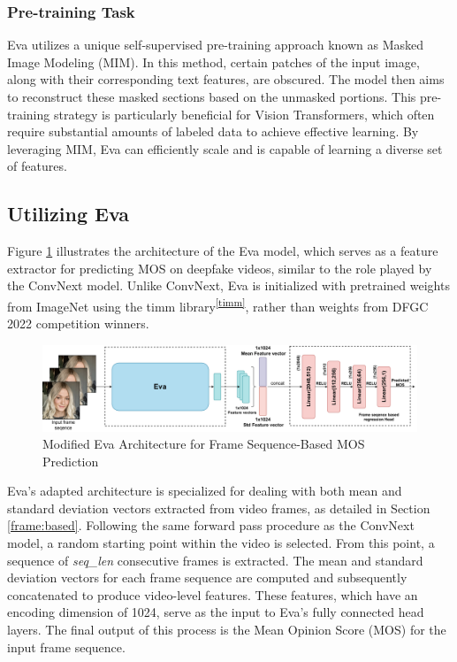 \documentclass[a4paper,12pt,openright]{book}
\begin{document}
\subsubsection{Pre-training Task}
\label{subsubsec:eva_pretraining}

Eva utilizes a unique self-supervised pre-training approach known as Masked Image Modeling (MIM). In this method, certain patches of the input image, along with their corresponding text features, are obscured. The model then aims to reconstruct these masked sections based on the unmasked portions. This pre-training strategy is particularly beneficial for Vision Transformers, which often require substantial amounts of labeled data to achieve effective learning. By leveraging MIM, Eva can efficiently scale and is capable of learning a diverse set of features. 

\newpage

\subsection{Utilizing Eva}

Figure \ref{fig:eva_my} illustrates the architecture of the Eva model, which serves as a feature extractor for predicting MOS on deepfake videos, similar to the role played by the ConvNext model. Unlike ConvNext, Eva is initialized with pretrained weights from ImageNet using the timm library\textsuperscript{\ref{timm}}, rather than weights from DFGC 2022 competition winners.

\begin{figure}[h]
\centering
\includegraphics[width=1.1\textwidth]{images/eva_my.drawio.pdf}
\caption{Modified Eva Architecture for Frame Sequence-Based MOS Prediction}
\label{fig:eva_my}
\end{figure}


Eva's adapted architecture is specialized for dealing with both mean and standard deviation vectors extracted from video frames, as detailed in Section \ref{frame:based}. Following the same forward pass procedure as the ConvNext model, a random starting point within the video is selected. From this point, a sequence of \textit{seq\_len} consecutive frames is extracted. The mean and standard deviation vectors for each frame sequence are computed and subsequently concatenated to produce video-level features. These features, which have an encoding dimension of 1024, serve as the input to Eva's fully connected head layers. The final output of this process is the Mean Opinion Score (MOS) for the input frame sequence. 
\end{document}
